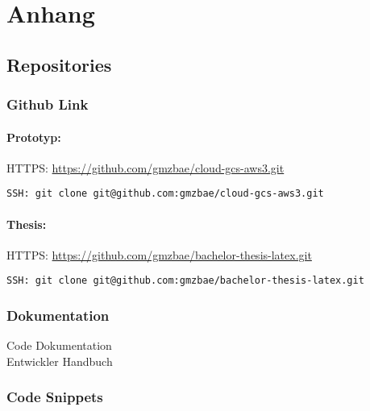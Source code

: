 
\chapter{Anhang}

\section{Repositories}
\subsection{Github Link}

\subsubsection*{Prototyp:}

HTTPS: \url{https://github.com/gmzbae/cloud-gcs-aws3.git}

\begin{verbatim}SSH: git clone git@github.com:gmzbae/cloud-gcs-aws3.git\end{verbatim}			

\subsubsection*{Thesis:}

HTTPS: \url{https://github.com/gmzbae/bachelor-thesis-latex.git}

\begin{verbatim}SSH: git clone git@github.com:gmzbae/bachelor-thesis-latex.git \end{verbatim}

\subsection{Dokumentation}

Code Dokumentation\\
Entwickler Handbuch

\subsection{Code Snippets}

\begin{lstlisting}
	
\end{lstlisting}

\clearpage